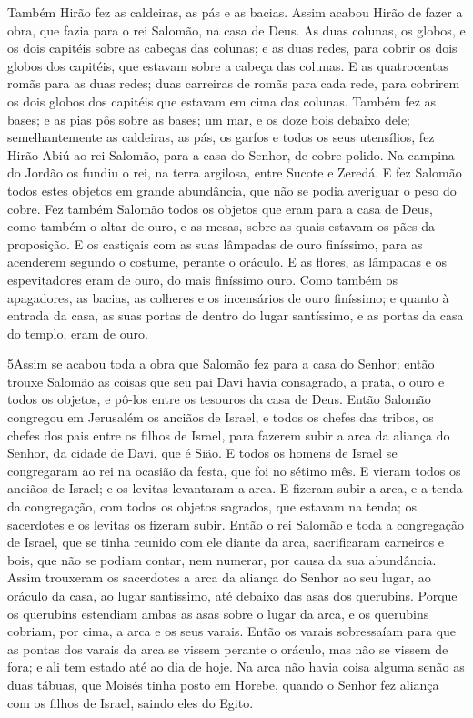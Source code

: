 Também Hirão fez as caldeiras, as pás e as bacias. Assim acabou
Hirão de fazer a obra, que fazia para o rei Salomão, na casa de
Deus. As duas colunas, os globos, e os dois capitéis sobre as
cabeças das colunas; e as duas redes, para cobrir os dois globos dos
capitéis, que estavam sobre a cabeça das colunas. E as
quatrocentas romãs para as duas redes; duas carreiras de romãs para
cada rede, para cobrirem os dois globos dos capitéis que estavam em
cima das colunas. Também fez as bases; e as pias pôs sobre as
bases; um mar, e os doze bois debaixo dele;
semelhantemente as caldeiras, as pás, os garfos e todos os
seus utensílios, fez Hirão Abiú ao rei Salomão, para a casa do
Senhor, de cobre polido. Na campina do Jordão os fundiu o
rei, na terra argilosa, entre Sucote e Zeredá. E fez Salomão
todos estes objetos em grande abundância, que não se podia averiguar
o peso do cobre. Fez também Salomão todos os objetos que eram
para a casa de Deus, como também o altar de ouro, e as mesas, sobre
as quais estavam os pães da proposição. E os castiçais com as
suas lâmpadas de ouro finíssimo, para as acenderem segundo o
costume, perante o oráculo. E as flores, as lâmpadas e os
espevitadores eram de ouro, do mais finíssimo ouro. Como
também os apagadores, as bacias, as colheres e os incensários de
ouro finíssimo; e quanto à entrada da casa, as suas portas de dentro
do lugar santíssimo, e as portas da casa do templo, eram de ouro.

\medskip

\lettrine{5} Assim se acabou toda a obra que Salomão fez para
a casa do Senhor; então trouxe Salomão as coisas que seu pai Davi
havia consagrado, a prata, o ouro e todos os objetos, e pô-los entre
os tesouros da casa de Deus. Então Salomão congregou em
Jerusalém os anciãos de Israel, e todos os chefes das tribos, os
chefes dos pais entre os filhos de Israel, para fazerem subir a arca
da aliança do Senhor, da cidade de Davi, que é Sião. E todos os
homens de Israel se congregaram ao rei na ocasião da festa, que foi
no sétimo mês. E vieram todos os anciãos de Israel; e os levitas
levantaram a arca. E fizeram subir a arca, e a tenda da
congregação, com todos os objetos sagrados, que estavam na tenda; os
sacerdotes e os levitas os fizeram subir. Então o rei Salomão e
toda a congregação de Israel, que se tinha reunido com ele diante da
arca, sacrificaram carneiros e bois, que não se podiam contar, nem
numerar, por causa da sua abundância. Assim trouxeram os
sacerdotes a arca da aliança do Senhor ao seu lugar, ao oráculo da
casa, ao lugar santíssimo, até debaixo das asas dos querubins.
Porque os querubins estendiam ambas as asas sobre o lugar da
arca, e os querubins cobriam, por cima, a arca e os seus varais.
Então os varais sobressaíam para que as pontas dos varais da
arca se vissem perante o oráculo, mas não se vissem de fora; e ali
tem estado até ao dia de hoje. Na arca não havia coisa alguma
senão as duas tábuas, que Moisés tinha posto em Horebe, quando o
Senhor fez aliança com os filhos de Israel, saindo eles do Egito.

